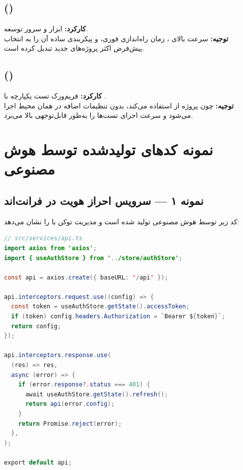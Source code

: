 \documentclass[12pt]{article} %
\theoremstyle{definition}
\begin{document}
\subsection{ ()}
\textbf{کارکرد:} ابزار  و سرور توسعه.\\
\textbf{توجیه:} سرعت بالای ، زمان راه‌اندازی فوری، و پیکربندی ساده آن را به انتخاب پیش‌فرض اکثر پروژه‌های جدید  تبدیل کرده است.

\subsection{ ()}
\textbf{کارکرد:} فریم‌ورک تست یکپارچه با .\\
\textbf{توجیه:} چون پروژه از  استفاده می‌کند،  بدون تنظیمات اضافه در همان محیط  اجرا می‌شود و سرعت اجرای تست‌ها را به‌طور قابل‌توجهی بالا می‌برد.

\section{نمونه کدهای تولیدشده توسط هوش مصنوعی}

\subsection{نمونه ۱ — سرویس احراز هویت در فرانت‌اند}

کد زیر توسط هوش مصنوعی تولید شده است و مدیریت توکن  با  را نشان می‌دهد:

\begin{latin}
\begin{lstlisting}[language=Java, caption={auth interceptor (TypeScript)}]
// src/services/api.ts
import axios from 'axios';
import { useAuthStore } from '../store/authStore';

const api = axios.create({ baseURL: '/api' });

api.interceptors.request.use((config) => {
  const token = useAuthStore.getState().accessToken;
  if (token) config.headers.Authorization = `Bearer ${token}`;
  return config;
});

api.interceptors.response.use(
  (res) => res,
  async (error) => {
    if (error.response?.status === 401) {
      await useAuthStore.getState().refresh();
      return api(error.config);
    }
    return Promise.reject(error);
  },
);

export default api;
\end{lstlisting}
\end{latin}
\end{document}
